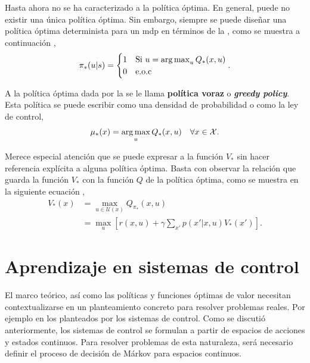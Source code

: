Hasta ahora no se ha caracterizado a la política óptima. En general, puede no existir una única política óptima. Sin embargo, siempre se puede diseñar una política óptima determinista para un \acrshort{mdp} en términos de la , como se muestra a continuación \cite{Sutton2018}, 
\begin{align}
    \pi_{*}(u|s) = 
    \begin{cases}
    1 & \text{Si } u= \operatorname*{arg\,max}_{u} Q_{*}(x, u) \\
    0 & \text{e.o.c}
    \end{cases}.
\label{eq:greedy_policy}
\end{align}

A la política óptima dada por la  se le llama \textbf{política voraz} o \textit{\textbf{greedy policy}}. Esta política se puede escribir como una densidad de probabilidad o como la ley de control,
\begin{align}
    \mu_{*}(x) = \operatorname*{arg\,max}_{u}Q_{*}(x, u) \quad \forall x \in \mathcal{X}.
\end{align}

Merece especial atención que se puede expresar a la función $V_{*}$ sin hacer referencia explícita a alguna política óptima. Basta con observar la relación que guarda la función $V_{*}$ con la función $Q$ de la política óptima, como se muestra en la siguiente ecuación \cite{Sutton2018},
\begin{equation}
    \begin{aligned}
    V_{*}(x) &= \max_{u \in \mathcal{U}(x)} Q_{\pi_{*}}(x, u) \\
    &= \max_{u}\left[r(x,u) + \gamma \sum_{x'}p(x'|x,u)V_{*}(x')\right]. 
    \label{eq:optimal_V}
\end{aligned}
\end{equation}


\section{Aprendizaje en sistemas de control}

El marco teórico, así como las políticas y funciones óptimas de valor necesitan contextualizarse en un planteamiento concreto para resolver problemas reales. Por ejemplo en los planteados por los sistemas de control. Como se discutió anteriormente, los sistemas de control se formulan a partir de espacios de acciones y estados continuos. Para resolver problemas de esta naturaleza, será necesario definir el proceso de decisión de Márkov para espacios continuos. 

